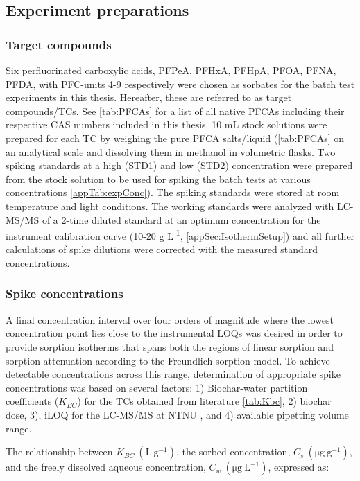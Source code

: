 \subsection{Experiment preparations}
\subsubsection{Target compounds}\label{sec:PFCAanalytic}
Six perfluorinated carboxylic acids, PFPeA, PFHxA, PFHpA, PFOA, PFNA, PFDA, with PFC-units 4-9 respectively were chosen as sorbates for the batch test experiments in this thesis. Hereafter, these are referred to as target compounds/TCs. See \cref{tab:PFCAs} for a list of all native PFCAs including their respective CAS numbers included in this thesis. 10 mL stock solutions were prepared for each TC by weighing the pure PFCA salts/liquid (\cref{tab:PFCAs} on an analytical scale and dissolving them in methanol in volumetric flasks. Two spiking standards at a high (STD1) and low (STD2) concentration were prepared from the stock solution to be used for spiking the batch tests at various concentrations \cref{appTab:expConc}). The spiking standards were stored at room temperature and light conditions. The working standards were analyzed with LC-MS/MS of a 2-time diluted standard at an optimum concentration for the instrument calibration curve (10-20 \textmu g L\textsuperscript{-1}, \cref{appSec:IsothermSetup}) and all further calculations of spike dilutions were corrected with the measured standard concentrations.



\subsubsection{Spike concentrations}
A final concentration interval over four orders of magnitude where the lowest concentration point lies close to the instrumental LOQs was desired in order to provide sorption isotherms that spans both the regions of linear sorption and sorption attenuation according to the Freundlich sorption model. To achieve detectable concentrations across this range, determination of appropriate spike concentrations was based on several factors: 1) Biochar-water partition coefficients ($K_{BC}$) for the TCs obtained from literature \cite{Xiao2017} \cref{tab:Kbc}, 2) biochar dose, 3), iLOQ for the LC-MS/MS at NTNU , and 4) available pipetting volume range. 

The relationship between $K_{BC}~\mathrm{(L~g^{-1})}$, the sorbed concentration, $C_s~\mathrm{(\mu g~g^{-1})}$, and the freely dissolved aqueous concentration, $C_w~\mathrm{(\mu g~L^{-1})}$, expressed as:

